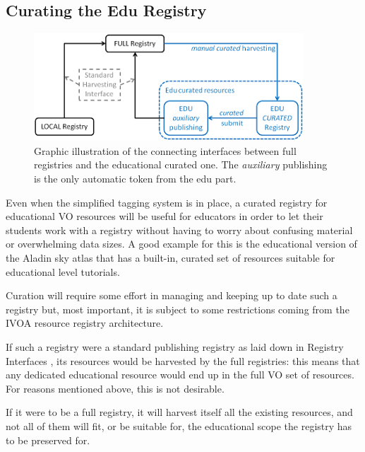 \documentclass{ivoa}
\begin{document}
\subsection{Curating the Edu Registry}

\label{sect:edureg}

\begin{figure}

\includegraphics[width=0.9\textwidth]{curation.png}
\caption{Graphic illustration
    of the connecting interfaces between full registries and the educational
    curated one. The 
\emph{auxiliary}
 publishing is the only automatic token
    from the edu part.}
\label{fig:curation}
\end{figure}




Even when the simplified 
tagging system is in place,
a curated registry for educational VO resources will be useful for
educators in order to let their students work with a registry without having to
worry about confusing material or overwhelming data sizes. A good example
for this is the educational version of the Aladin sky atlas that has a
built-in, curated set of resources suitable for educational level 
tutorials.
  


Curation will require some effort in managing and keeping up to date
such a registry but, most important, it is subject to  some restrictions coming from
the IVOA resource registry architecture. 
  


If such a registry were a standard publishing registry as laid down in
Registry Interfaces
\citep{2009ivoa.spec.1104B},
its resources would be harvested by the full registries: this means 
that any dedicated educational resource would end up in the full VO 
set of resources.  For reasons mentioned above, this is not
desirable.


If it were to be a full registry, it will harvest itself all the existing
resources, and not all of them will fit, or be suitable for, the educational
scope the registry has to be preserved for.
  
\end{document}
